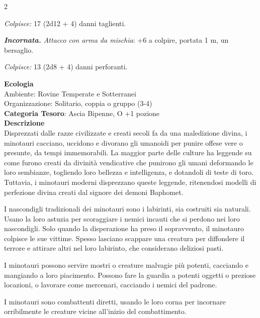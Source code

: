 \begin{multicols}{2}
{\emph{Colpisce:} 17 (2d12 + 4) danni taglienti.

\emph{\textbf{Incornata.} Attacco con arma da mischia}: +6 a colpire, portata 1 m, un bersaglio.

\emph{Colpisce:} 13 (2d8 + 4) danni perforanti.

\textbf{Ecologia}\\
Ambiente: Rovine Temperate e Sotterranei\\
Organizzazione: Solitario, coppia o gruppo (3-4)\\
\textbf{Categoria Tesoro}: Ascia Bipenne, O +1 pozione\\
\textbf{Descrizione}\\
Disprezzati dalle razze civilizzate e creati secoli fa da una maledizione divina, i minotauri cacciano, uccidono e divorano gli umanoidi per punire offese vere o presunte, da tempi immemorabili. La maggior parte delle culture ha leggende su come furono creati da divinità vendicative che punirono gli umani deformando le loro sembianze, togliendo loro bellezza e intelligenza, e dotandoli di teste di toro. Tuttavia, i minotauri moderni disprezzano queste leggende, ritenendosi modelli di perfezione divina creati dal signore dei demoni Baphomet.

I nascondigli tradizionali dei minotauri sono i labirinti, sia costruiti sia naturali. Usano la loro astuzia per scoraggiare i nemici incauti che si perdono nei loro nascondigli. Solo quando la disperazione ha preso il sopravvento, il minotauro colpisce le sue vittime. Spesso lasciano scappare una creatura per diffondere il terrore e attirare altri nel loro labirinto, che considerano deliziosi pasti.

I minotauri possono servire mostri o creature malvagie più potenti, cacciando e mangiando a loro piacimento. Possono fare la guardia a potenti oggetti o preziose locazioni, o lavorare come mercenari, cacciando i nemici del padrone.

I minotauri sono combattenti diretti, usando le loro corna per incornare orribilmente le creature vicine all'inizio del combattimento.

}
\end{multicols}
